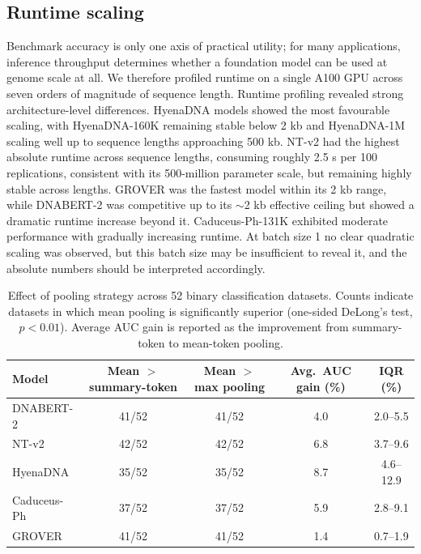 \documentclass[11pt,a4paper]{article}
\begin{document}
\subsection{Runtime scaling}
Benchmark accuracy is only one axis of practical utility; for many applications, inference throughput determines whether a foundation model can be used at genome scale at all. We therefore profiled runtime on a single A100 GPU across seven orders of magnitude of sequence length. Runtime profiling revealed strong architecture-level differences. HyenaDNA models showed the most favourable scaling, with HyenaDNA-160K remaining stable below 2 kb and HyenaDNA-1M scaling well up to sequence lengths approaching 500 kb. NT-v2 had the highest absolute runtime across sequence lengths, consuming roughly 2.5 s per 100 replications, consistent with its 500-million parameter scale, but remaining highly stable across lengths. GROVER was the fastest model within its 2 kb range, while DNABERT-2 was competitive up to its $\sim$2 kb effective ceiling but showed a dramatic runtime increase beyond it. Caduceus-Ph-131K exhibited moderate performance with gradually increasing runtime. At batch size 1 no clear quadratic scaling was observed, but this batch size may be insufficient to reveal it, and the absolute numbers should be interpreted accordingly.

\begin{table}[htbp]
\centering
\small
\caption{Effect of pooling strategy across 52 binary classification datasets. Counts indicate datasets in which mean pooling is significantly superior (one-sided DeLong's test, $p < 0.01$). Average AUC gain is reported as the improvement from summary-token to mean-token pooling.}
\label{tab:pooling}
\begin{tabular}{@{}lcccc@{}}
\toprule
Model & Mean $>$ summary-token & Mean $>$ max pooling & Avg.\ AUC gain (\%) & IQR (\%) \\
\midrule
DNABERT-2   & 41/52 & 41/52 & 4.0 & 2.0--5.5 \\
NT-v2       & 42/52 & 42/52 & 6.8 & 3.7--9.6 \\
HyenaDNA    & 35/52 & 35/52 & 8.7 & 4.6--12.9 \\
Caduceus-Ph & 37/52 & 37/52 & 5.9 & 2.8--9.1 \\
GROVER      & 41/52 & 41/52 & 1.4 & 0.7--1.9 \\
\bottomrule
\end{tabular}
\end{table}
\end{document}
